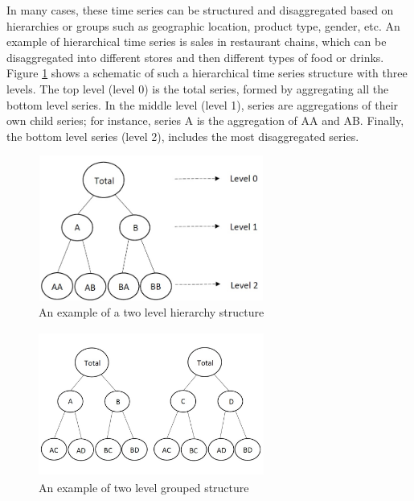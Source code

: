 \documentclass[11pt,a4paper,]{article}
\begin{document}
In many cases, these time series can be structured and disaggregated based on hierarchies or groups such as geographic location, product type, gender, etc. An example of hierarchical time series is sales in restaurant chains, which can be disaggregated into different stores and then different types of food or drinks. Figure \ref{fig:hierarchicalexample} shows a schematic of such a hierarchical time series structure with three levels. The top level (level 0) is the total series, formed by aggregating all the bottom level series. In the middle level (level 1), series are aggregations of their own child series; for instance, series A is the aggregation of AA and AB. Finally, the bottom level series (level 2), includes the most disaggregated series.

\begin{figure}

{\centering \includegraphics[width=280px,height=180px]{Paper-Figures/hierarchical_example} 

}

\caption{An example of a two level hierarchy structure}\label{fig:hierarchicalexample}
\end{figure}

\begin{figure}

{\centering \includegraphics[width=280px,height=180px]{hcf_files/figure-latex/groupexample-1} 

}

\caption{An example of two level grouped structure}\label{fig:groupexample}
\end{figure}
\end{document}
